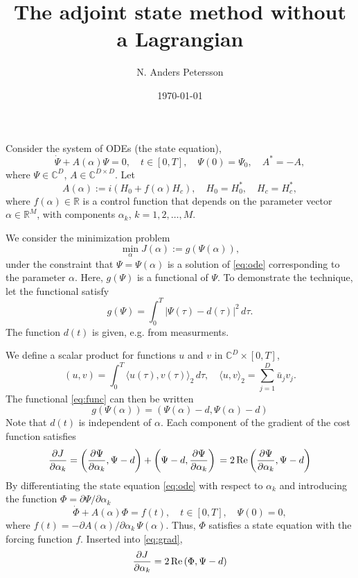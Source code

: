 \documentclass{article}
\begin{document}
\title{The adjoint state method without a Lagrangian}
\author{N. Anders Petersson}
\date{\today}
\maketitle

Consider the system of ODEs (the state equation),
\begin{equation}\label{eq:ode}
  \dot{\Psi} + A(\alpha)\Psi =0,\quad
  t\in[0,T], \quad \Psi(0) = \Psi_0,\quad A^* = -A,
\end{equation}
where $\Psi\in {\mathbb C}^D$, $A\in {\mathbb C}^{D\times D}$. Let
\[
A(\alpha) := i\left(H_0 + f(\alpha)H_c\right),\quad H_0=H_0^*, \quad H_c = H_c^*,
\]
where $f(\alpha)\in \mathbb{R}$ is a control function that depends
on the parameter vector $\alpha\in{\mathbb R}^M$, with components $\alpha_k$,
$k=1,2,\ldots,M$.

We consider the minimization problem
\[
\min_\alpha J(\alpha) := g(\Psi(\alpha)),
\]
under the constraint that $\Psi=\Psi(\alpha)$ is a solution of \eqref{eq:ode}
corresponding to the parameter $\alpha$.  Here, $g(\Psi)$ is a
functional of $\Psi$. To demonstrate the technique, let the functional
satisfy
\begin{equation}\label{eq:func}
  g(\Psi) = \int_0^T |\Psi(\tau) - d(\tau)|^2\, d\tau.
\end{equation}
The function $d(t)$ is given, e.g. from measurments.

We define a scalar product for functions $u$ and $v$ in ${\mathbb C}^D \times [0,T]$,
\[
(u,v) = \int_0^T \langle u(\tau), v(\tau)\rangle_2\, d\tau,\quad \langle u, v\rangle_2 =
\sum_{j=1}^D \bar{u}_j v_j.
\]
The functional \eqref{eq:func} can then be written
\[
g(\Psi(\alpha)) = (\Psi(\alpha) - d, \Psi(\alpha) - d)
\]
Note that $d(t)$ is independent of $\alpha$. Each component of the gradient of the cost function satisfies
\begin{equation}\label{eq:grad}
  \frac{\partial J}{\partial \alpha_k} =
%
  \left(\frac{\partial\Psi}{\partial \alpha_k}, \Psi-d \right) +
  \left(\Psi-d, \frac{\partial\Psi}{\partial \alpha_k} \right) \\
  = 2\, {\rm Re} \left(
\frac{\partial\Psi}{\partial \alpha_k}, \Psi-d \right)
\end{equation}
By differentiating the state equation \eqref{eq:ode} with respect to
$\alpha_k$ and introducing the function $\Phi = \partial \Psi/\partial \alpha_k$
\begin{equation}\label{eq:state}
\dot{\Phi} +
A(\alpha) \Phi = f(t),\quad
t\in[0,T], \quad \Psi(0) = 0,
\end{equation}
where $f(t) = - \partial A(\alpha)/\partial \alpha_k\,\Psi(\alpha)$.
Thus, $\Phi$ satisfies a state equation with the forcing function
$f$. Inserted into \eqref{eq:grad},
\begin{equation}\label{eq:grad-formula}
\frac{\partial J}{\partial \alpha_k} = 2\, {\rm Re} \left( \Phi, \Psi-d \right)
\end{equation}
 
\end{document}
